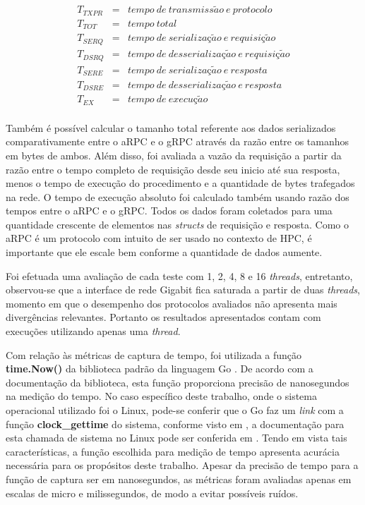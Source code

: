 \begin{eqnarray*} 
T_{TXPR} & = & tempo ~de ~transmiss\tilde{a}o ~e ~protocolo \\
T_{TOT}  & = & tempo ~total  \\
T_{SERQ} & = & tempo ~de ~serializa\textit{\c{c}}\tilde{a}o ~e ~requisi\textit{\c{c}}\tilde{a}o \\
T_{DSRQ} & = & tempo ~de  ~desserializa\textit{\c{c}}\tilde{a}o ~e ~requisi\text{\c{c}}\tilde{a}o  \\
T_{SERE} & = & tempo ~de ~serializa\textit{\c{c}}\tilde{a}o ~e ~resposta  \\
T_{DSRE} & = & tempo  ~de  ~desserializa\textit{\c{c}}\tilde{a}o ~e ~resposta  \\
T_{EX} & = &  tempo ~de ~execu\textit{\c{c}}\tilde{a}o  \\
\end{eqnarray*}

Também é possível calcular o tamanho total referente aos dados serializados comparativamente entre o aRPC e o gRPC através da razão entre os tamanhos em bytes de ambos. Além disso, foi avaliada a vazão da requisição a partir da razão entre o tempo completo de requisição desde seu inicio até sua resposta, menos o tempo de execução do procedimento e a quantidade de bytes trafegados na rede.  O tempo de execução absoluto foi calculado também usando razão dos tempos entre o aRPC e o gRPC. Todos os dados foram coletados para uma quantidade crescente de elementos nas \textit{structs} de requisição e resposta. Como o aRPC é um protocolo com intuito de ser usado no contexto de HPC, é importante que ele escale bem conforme a quantidade de dados aumente.

Foi efetuada uma avaliação de cada teste com 1, 2, 4, 8 e 16 \textit{threads}, entretanto, observou-se que a interface de rede Gigabit fica saturada a partir de duas \textit{threads}, momento em que o desempenho dos protocolos avaliados não apresenta mais divergências relevantes. Portanto os resultados apresentados contam com execuções utilizando apenas uma \textit{thread}.

Com relação às métricas de captura de tempo, foi utilizada a função \textbf{time.Now()} da biblioteca padrão da linguagem Go \cite{golang_time_2021}. De acordo com a documentação da biblioteca, esta função proporciona precisão de nanosegundos na medição do tempo. No caso específico deste trabalho, onde o sistema operacional utilizado foi o Linux, pode-se conferir que o Go faz um \textit{link} com a função \textbf{clock\_gettime} do sistema, conforme visto em \cite{golang_golanggo_2021}, a documentação para esta chamada de sistema no Linux pode ser conferida em \cite{linux_clock_getres2_2021}. Tendo em vista tais características, a função escolhida para medição de tempo apresenta acurácia necessária para os propósitos deste trabalho. Apesar da precisão de tempo para a função de captura ser em nanosegundos, as métricas foram avaliadas apenas em escalas de micro e milissegundos, de modo a evitar possíveis ruídos.

